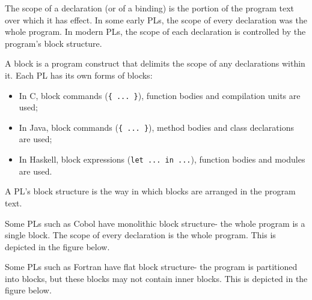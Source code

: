 \documentclass[a4paper, openany]{memoir}
\begin{document}
The scope of a declaration (or of a binding) is the portion of the program text over which it has effect. In some early PLs, the scope of every declaration was the whole program. In modern PLs, the scope of each declaration is controlled by the program's block structure.

A block is a program construct that delimits the scope of any declarations within it. Each PL has its own forms of blocks:
\begin{itemize}
    \item In C, block commands (\texttt{\{ ... \}}), function bodies and compilation units are used;
    \item In Java, block commands (\texttt{\{ ... \}}), method bodies and class declarations are used;
    \item In Haskell, block expressions (\texttt{let ... in ...}), function bodies and modules are used.
\end{itemize}
A PL's block structure is the way in which blocks are arranged in the program text.

Some PLs such as Cobol have monolithic block structure- the whole program is a single block. The scope of every declaration is the whole program. This is depicted in the figure below.
\begin{figure}[H]
    \centering
\end{figure}

Some PLs such as Fortran have flat block structure- the program is partitioned into blocks, but these blocks may not contain inner blocks. This is depicted in the figure below.
\begin{figure}[H]
    \centering
\end{figure}
\end{document}
